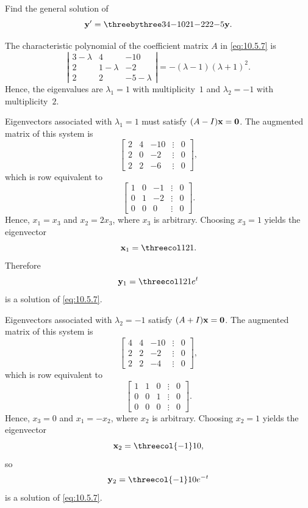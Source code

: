 \setcounter{example}{2}
\setcounter{equation}{6}
\begin{example}
  \label{example:10.5.3}\rm Find the general solution of
  \begin{equation}
    \label{eq:10.5.7}{\bf y}'=\threebythree34{-10}21{-2}22{-5}{\bf y}.
  \end{equation}
\end{example}
\setcounter{equation}{7}
\begin{examplesolution}
\solution The characteristic polynomial of the coefficient matrix $A$ in \eqref{eq:10.5.7} is
\[
  \left|
  \begin{array}{ccc}
    3-\lambda & 4         & -10        \\
    2         & 1-\lambda & -2         \\
    2         & 2         & -5-\lambda
  \end{array}\right|=- (\lambda-1)(\lambda+1)^{2}.
\]
Hence, the eigenvalues are $\lambda_{1}=1$ with multiplicity~$1$ and $\lambda_{2}=-1$ with
multiplicity~$2$.

Eigenvectors associated with $\lambda_{1}=1$ must satisfy $(A-I){\bf x}={\bf0}$. The augmented
matrix of this system is
\[
  \left[
  \begin{array}{rrrcr}
    2 & 4 & -10 & \vdots & 0 \\
    2 & 0 & -2  & \vdots & 0 \\
    2 & 2 & -6  & \vdots & 0
  \end{array}\right],
\]
which is row equivalent to
\[
  \left[
  \begin{array}{rrrcr}
    1 & 0 & -1 & \vdots & 0 \\
    0 & 1 & -2 & \vdots & 0 \\
    0 & 0 & 0  & \vdots & 0
  \end{array}\right].
\]
Hence, $x_{1}=x_{3}$ and $x_{2}=2x_{3}$, where $x_{3}$ is arbitrary. Choosing $x_{3}=1$ yields the
eigenvector
\[
  {\bf x}_{1}=\threecol121.
\]
Therefore
\[
  {\bf y}_{1}=\threecol121e^{t}
\]
is a solution of \eqref{eq:10.5.7}.

Eigenvectors associated with $\lambda_{2}=-1$ satisfy $(A+I){\bf x}={\bf0}$. The augmented matrix of
this system is
\[
  \left[
  \begin{array}{rrrcr}
    4 & 4 & -10 & \vdots & 0 \\
    2 & 2 & -2  & \vdots & 0 \\
    2 & 2 & -4  & \vdots & 0
  \end{array}\right],
\]
which is row equivalent to
\[
  \left[
  \begin{array}{rrrcr}
    1 & 1 & 0 & \vdots & 0 \\
    0 & 0 & 1 & \vdots & 0 \\
    0 & 0 & 0 & \vdots & 0
  \end{array}\right].
\]
Hence, $x_{3}=0$ and $x_{1}=-x_{2}$, where $x_{2}$ is arbitrary. Choosing $x_{2}=1$ yields the
eigenvector
\[
  {\bf x}_{2}=\threecol{-1}10,
\]
so
\[
  {\bf y}_{2}=\threecol{-1}10e^{-t}
\]
is a solution of \eqref{eq:10.5.7}.


\end{examplesolution}
